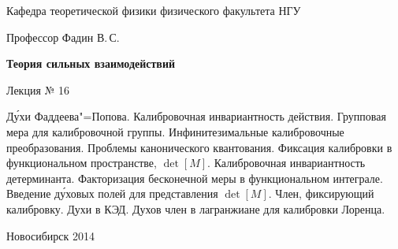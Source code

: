 \documentclass[12pt,pagesize,paper=192mm:108mm]{scrbook}
\begin{document}
\begin{titlepage}
\begin{center}
    Кафедра теоретической физики физического факультета НГУ
    \medskip

    \Large
    Профессор Фадин В.\,С.

    \huge
    \textbf{Теория сильных взаимодействий}
    \smallskip
    
    \Large
    Лекция № 16
    \vfill
    
    \normalsize
    \begin{minipage}{0.77\linewidth}
      Д\'{у}хи Фаддеева"=Попова. Калибровочная инвариантность
      действия. Групповая мера для калибровочной
      группы. Инфинитезимальные калибровочные преобразования. Проблемы
      канонического квантования. Фиксация калибровки в функциональном
      пространстве, $\det[M]$. Калибровочная инвариантность
      детерминанта. Факторизация бесконечной меры в функциональном
      интеграле. Введение д\'{у}ховых полей для представления
      $\det[M]$. Член, фиксирующий калибровку. Духи в КЭД. Духов член
      в лагранжиане для калибровки Лоренца.
    \end{minipage}
    \vfill
    
    \normalsize \ccbysa\hspace{0.5em}  Новосибирск 2014   
  \end{center}
\end{titlepage}
\end{document}
